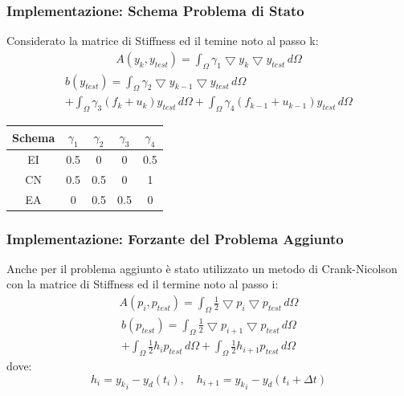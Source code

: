 \documentclass{beamer}
\theoremstyle{definition}
\theoremstyle{remark}
\theoremstyle{plain}
\theoremstyle{definition}
\begin{document}
\begin{frame}
\frametitle{Implementazione: Schema Problema di Stato}
Considerato la matrice di Stiffness ed il temine noto al passo k:
\begin{multline*}
A(y_k,y_{test}) = \int_{\Omega} \gamma_1 \bigtriangledown y_k \bigtriangledown y_{test} \, d\Omega 
\end{multline*}
\begin{multline*}
b(y_{test}) = \int_{\Omega} \gamma_2 \bigtriangledown y_{k-1} \bigtriangledown y_{test} \, d\Omega \\+ \int_{\Omega} \gamma_3 (f_{k}+u_k)y_{test} \, d\Omega + \int_{\Omega} \gamma_4 (f_{k-1}+u_{k-1})y_{test} \, d\Omega
\end{multline*}

\begin{table}
\centering
\begin{tabular}{|c|c|c|c|c|}
\hline
\textbf{Schema} & \textbf{$\gamma_1$} &\textbf{$\gamma_2$} & \textbf{$\gamma_3$} &\textbf{$\gamma_4$} \\
\hline
EI & 0.5 & 0 & 0 & 0.5 \\
\hline
CN & 0.5 & 0.5 & 0 & 1 \\
\hline
EA & 0 & 0.5 & 0.5 & 0\\
\hline
\end{tabular}
\end{table}
\end{frame}

\begin{frame}
\frametitle{Implementazione: Forzante del Problema Aggiunto}
Anche per il problema aggiunto è stato utilizzato un metodo di Crank-Nicolson con la matrice di Stiffness ed il termine noto al passo i:
\begin{multline*}
A(p_i,p_{test}) = \int_{\Omega} \frac{1}{2}\bigtriangledown p_i \bigtriangledown p_{test} \, d\Omega 
\end{multline*}
\begin{multline*}
b(p_{test}) = \int_{\Omega} \frac{1}{2} \bigtriangledown p_{i+1} \bigtriangledown p_{test} \, d\Omega \\+ \int_{\Omega} \frac{1}{2} h_i p_{test} \, d\Omega + \int_{\Omega} \frac{1}{2} h_{i+1} p_{test} \, d\Omega
\end{multline*}
dove:
\begin{equation*}
h_i = {y_k}_i - y_d(t_i), \quad
h_{i+1} = {y_k}_i - y_d(t_i+{\Delta}t)
\end{equation*}

\end{frame}
\end{document}
